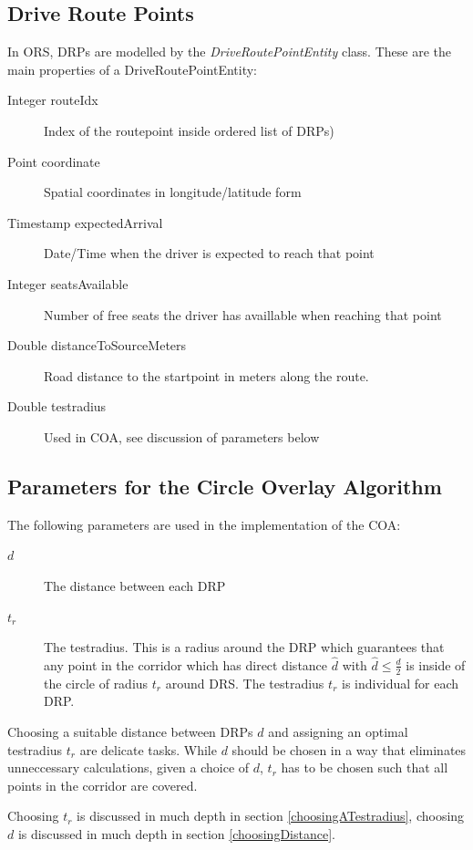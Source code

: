 \subsection{Drive Route Points}
In ORS, DRPs are modelled by the \emph{DriveRoutePointEntity} class.
These are the main properties of a DriveRoutePointEntity:

\begin{description}
     	 \item[Integer routeIdx]{Index of the routepoint inside ordered list of DRPs)} 
	 \item[Point coordinate]{Spatial coordinates in longitude/latitude form} 
  	 \item[Timestamp expectedArrival]{Date/Time when the driver is expected to reach that point}     
    	 \item[Integer seatsAvailable]{Number of free seats the driver has availlable when reaching that point} 
	 \item[Double distanceToSourceMeters]{Road distance to the startpoint in meters along the route.} 
         \item[Double testradius]{Used in COA, see discussion of parameters below}
\end{description}

\subsection{Parameters for the Circle Overlay Algorithm}
The following parameters are used in the implementation of the COA:
\begin{description}
\item[$d$]{The distance between each DRP}
\item[$t_r$]{The testradius. This is a radius around the DRP which guarantees that 
	     any point in the corridor which has direct distance $\hat{d}$ with
	     $\hat{d} \leq \frac{d}{2}$ is inside of the circle of radius $t_r$ around DRS.
	     The testradius $t_r$ is individual for each DRP.}
\end{description}
Choosing a suitable distance between DRPs $d$ and assigning an optimal testradius $t_r$ 
are delicate tasks. While $d$ should be chosen in a way that eliminates unneccessary calculations,
given a choice of $d$, $t_r$ has to be chosen such that all points in the corridor are covered.
\par{
Choosing $t_r$ is discussed in much depth in section \ref{choosingATestradius},
choosing $d$ is discussed in much depth in section \ref{choosingDistance}.
}

